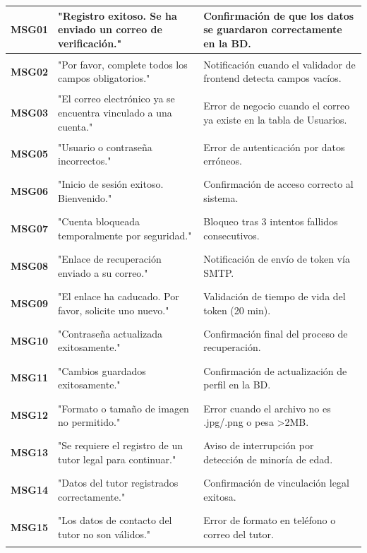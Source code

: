 \begin{longtable}{|p{2cm}|p{6cm}|p{6cm}|}
    \hypertarget{msg:MSG01}{\textbf{MSG01}} & "Registro exitoso. Se ha enviado un correo de verificación." & Confirmación de que los datos se guardaron correctamente en la BD. \\ \hline
    \hypertarget{msg:MSG02}{\textbf{MSG02}} & "Por favor, complete todos los campos obligatorios." & Notificación cuando el validador de frontend detecta campos vacíos. \\ \hline
    \hypertarget{msg:MSG03}{\textbf{MSG03}} & "El correo electrónico ya se encuentra vinculado a una cuenta." & Error de negocio cuando el correo ya existe en la tabla de Usuarios. \\ \hline
    \hypertarget{msg:MSG05}{\textbf{MSG05}} & "Usuario o contraseña incorrectos." & Error de autenticación por datos erróneos. \\ \hline
    \hypertarget{msg:MSG06}{\textbf{MSG06}} & "Inicio de sesión exitoso. Bienvenido." & Confirmación de acceso correcto al sistema. \\ \hline
    \hypertarget{msg:MSG07}{\textbf{MSG07}} & "Cuenta bloqueada temporalmente por seguridad." & Bloqueo tras 3 intentos fallidos consecutivos. \\ \hline
    \hypertarget{msg:MSG08}{\textbf{MSG08}} & "Enlace de recuperación enviado a su correo." & Notificación de envío de token vía SMTP. \\ \hline
    \hypertarget{msg:MSG09}{\textbf{MSG09}} & "El enlace ha caducado. Por favor, solicite uno nuevo." & Validación de tiempo de vida del token (20 min). \\ \hline
    \hypertarget{msg:MSG10}{\textbf{MSG10}} & "Contraseña actualizada exitosamente." & Confirmación final del proceso de recuperación. \\ \hline
    \hypertarget{msg:MSG11}{\textbf{MSG11}} & "Cambios guardados exitosamente." & Confirmación de actualización de perfil en la BD. \\ \hline
    \hypertarget{msg:MSG12}{\textbf{MSG12}} & "Formato o tamaño de imagen no permitido." & Error cuando el archivo no es .jpg/.png o pesa >2MB. \\ \hline
    \hypertarget{msg:MSG13}{\textbf{MSG13}} & "Se requiere el registro de un tutor legal para continuar." & Aviso de interrupción por detección de minoría de edad. \\ \hline
    \hypertarget{msg:MSG14}{\textbf{MSG14}} & "Datos del tutor registrados correctamente." & Confirmación de vinculación legal exitosa. \\ \hline
    \hypertarget{msg:MSG15}{\textbf{MSG15}} & "Los datos de contacto del tutor no son válidos." & Error de formato en teléfono o correo del tutor. \\ \hline

\end{longtable}
